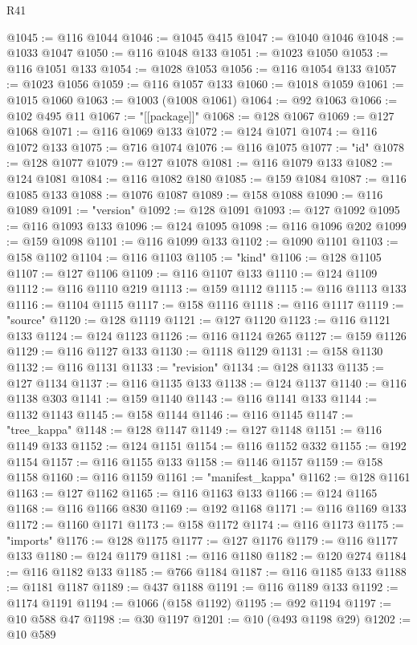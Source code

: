 \begin{lexlean}{R41}
\begin{coremodule}
@1045 := @116 @1044
@1046 := @1045 @415
@1047 := @1040 @1046
@1048 := @1033 @1047
@1050 := @116 @1048 @133
@1051 := @1023 @1050
@1053 := @116 @1051 @133
@1054 := @1028 @1053
@1056 := @116 @1054 @133
@1057 := @1023 @1056
@1059 := @116 @1057 @133
@1060 := @1018 @1059
@1061 := @1015 @1060
@1063 := @1003 (@1008 @1061)
@1064 := @92 @1063
@1066 := @102 @495 @11
@1067 := "[[package]]"
@1068 := @128 @1067
@1069 := @127 @1068
@1071 := @116 @1069 @133
@1072 := @124 @1071
@1074 := @116 @1072 @133
@1075 := @716 @1074
@1076 := @116 @1075
@1077 := "id"
@1078 := @128 @1077
@1079 := @127 @1078
@1081 := @116 @1079 @133
@1082 := @124 @1081
@1084 := @116 @1082 @180
@1085 := @159 @1084
@1087 := @116 @1085 @133
@1088 := @1076 @1087
@1089 := @158 @1088
@1090 := @116 @1089
@1091 := "version"
@1092 := @128 @1091
@1093 := @127 @1092
@1095 := @116 @1093 @133
@1096 := @124 @1095
@1098 := @116 @1096 @202
@1099 := @159 @1098
@1101 := @116 @1099 @133
@1102 := @1090 @1101
@1103 := @158 @1102
@1104 := @116 @1103
@1105 := "kind"
@1106 := @128 @1105
@1107 := @127 @1106
@1109 := @116 @1107 @133
@1110 := @124 @1109
@1112 := @116 @1110 @219
@1113 := @159 @1112
@1115 := @116 @1113 @133
@1116 := @1104 @1115
@1117 := @158 @1116
@1118 := @116 @1117
@1119 := "source"
@1120 := @128 @1119
@1121 := @127 @1120
@1123 := @116 @1121 @133
@1124 := @124 @1123
@1126 := @116 @1124 @265
@1127 := @159 @1126
@1129 := @116 @1127 @133
@1130 := @1118 @1129
@1131 := @158 @1130
@1132 := @116 @1131
@1133 := "revision"
@1134 := @128 @1133
@1135 := @127 @1134
@1137 := @116 @1135 @133
@1138 := @124 @1137
@1140 := @116 @1138 @303
@1141 := @159 @1140
@1143 := @116 @1141 @133
@1144 := @1132 @1143
@1145 := @158 @1144
@1146 := @116 @1145
@1147 := "tree_kappa"
@1148 := @128 @1147
@1149 := @127 @1148
@1151 := @116 @1149 @133
@1152 := @124 @1151
@1154 := @116 @1152 @332
@1155 := @192 @1154
@1157 := @116 @1155 @133
@1158 := @1146 @1157
@1159 := @158 @1158
@1160 := @116 @1159
@1161 := "manifest_kappa"
@1162 := @128 @1161
@1163 := @127 @1162
@1165 := @116 @1163 @133
@1166 := @124 @1165
@1168 := @116 @1166 @830
@1169 := @192 @1168
@1171 := @116 @1169 @133
@1172 := @1160 @1171
@1173 := @158 @1172
@1174 := @116 @1173
@1175 := "imports"
@1176 := @128 @1175
@1177 := @127 @1176
@1179 := @116 @1177 @133
@1180 := @124 @1179
@1181 := @116 @1180
@1182 := @120 @274
@1184 := @116 @1182 @133
@1185 := @766 @1184
@1187 := @116 @1185 @133
@1188 := @1181 @1187
@1189 := @437 @1188
@1191 := @116 @1189 @133
@1192 := @1174 @1191
@1194 := @1066 (@158 @1192)
@1195 := @92 @1194
@1197 := @10 @588 @47
@1198 := @30 @1197
@1201 := @10 (@493 @1198 @29)
@1202 := @10 @589

\end{coremodule}
\end{lexlean}
